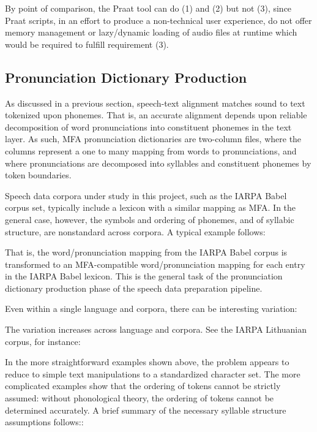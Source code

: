 \documentclass[11pt]{article}
\begin{document}
By point of comparison, the Praat tool can do (1) and (2) but not (3), since Praat scripts, in an effort to produce a non-technical user experience, do not offer memory management or lazy/dynamic loading of audio files at runtime which would be required to fulfill requirement (3).


\subsection{Pronunciation Dictionary Production}

As discussed in a previous section, speech-text alignment matches sound to text tokenized upon phonemes. That is, an accurate alignment depends upon reliable decomposition of word pronunciations into constituent phonemes in the text layer. As such, MFA pronunciation dictionaries are two-column files, where the columns represent a one to many mapping from words to pronunciations, and where pronunciations are decomposed into syllables and constituent phonemes by token boundaries.

Speech data corpora under study in this project, such as the IARPA Babel corpus set, typically include a lexicon with a similar mapping as MFA. In the general case, however, the symbols and ordering of phonemes, and of syllabic structure, are nonstandard across corpora. A typical example follows:


That is, the word/pronunciation mapping from the IARPA Babel corpus is transformed to an MFA-compatible word/pronunciation mapping for each entry in the IARPA Babel lexicon. This is the general task of the pronunciation dictionary production phase of the speech data preparation pipeline.

Even within a single language and corpora, there can be interesting variation:


The variation increases across language and corpora. See the IARPA Lithuanian corpus, for instance:


In the more straightforward examples shown above, the problem appears to reduce to simple text manipulations to a standardized character set. The more complicated examples show that the ordering of tokens cannot be strictly assumed: without phonological theory, the ordering of tokens cannot be determined accurately. A brief summary of the necessary syllable structure assumptions follows:\cite{fromkin_introduction_2006}:
\end{document}
